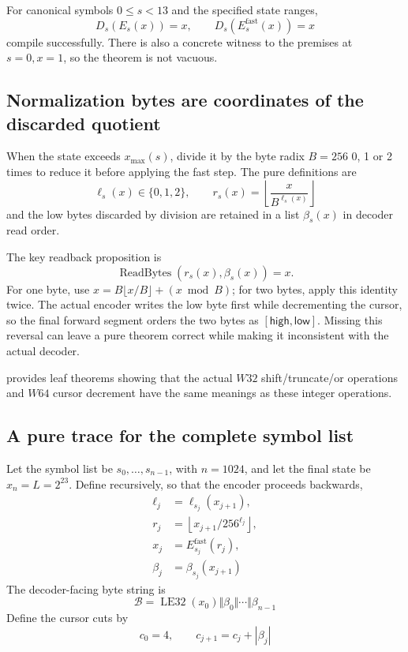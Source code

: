 \begin{verified}
For canonical symbols \(0\le s<13\) and the specified state ranges,
\[
  D_s(E_s(x))=x,\qquad
  D_s(E^{\mathrm{fast}}_s(x))=x
\]
compile successfully. There is also a concrete witness to the premises at
\(s=0,x=1\), so the theorem is not vacuous.
\end{verified}

\subsection{Normalization bytes are coordinates of the discarded quotient}

When the state exceeds \(x_{\max}(s)\), divide it by the byte radix
\(B=256\) 0, 1 or 2 times to reduce it before applying the fast step.
The pure definitions are
\[
  \ell_s(x)\in\{0,1,2\},\qquad
  r_s(x)=\left\lfloor\frac{x}{B^{\ell_s(x)}}\right\rfloor
\]
and the low bytes discarded by division are retained in a list
\(\beta_s(x)\) in decoder read order.

The key readback proposition is
\[
  \operatorname{ReadBytes}(r_s(x),\beta_s(x))=x.
\]
For one byte, use \(x=B\lfloor x/B\rfloor+(x\bmod B)\); for two bytes, apply
this identity twice. The actual encoder writes the low byte first while
decrementing the cursor, so the final forward segment orders the two bytes as
\([\mathsf{high},\mathsf{low}]\). Missing this reversal can leave a pure theorem
correct while making it inconsistent with the actual decoder.

 provides leaf theorems showing that the
actual \(W32\) shift/truncate/or operations and \(W64\) cursor decrement have
the same meanings as these integer operations.

\subsection{A pure trace for the complete symbol list}

Let the symbol list be \(s_0,\ldots,s_{n-1}\), with \(n=1024\), and let the
final state be \(x_n=L=2^{23}\). Define recursively, so that the encoder proceeds
backwards,
\[
\begin{aligned}
  \ell_j&=\ell_{s_j}(x_{j+1}),\\
  r_j&=\left\lfloor x_{j+1}/256^{\ell_j}\right\rfloor,\\
  x_j&=E^{\mathrm{fast}}_{s_j}(r_j),\\
  \beta_j&=\beta_{s_j}(x_{j+1})
\end{aligned}
\]
The decoder-facing byte string is
\[
  \mathcal B=\operatorname{LE32}(x_0)
    \Vert\beta_0\Vert\cdots\Vert\beta_{n-1}
\]
Define the cursor cuts by
\[
  c_0=4,\qquad c_{j+1}=c_j+|\beta_j|
\]

